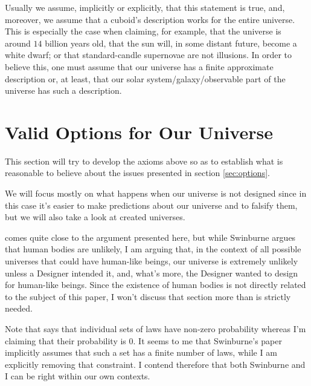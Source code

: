 \documentclass[a4paper
,draft
]{article}
\newcommand{\paper}[1]{paper}
\newcommand{\ghilimele}[1]{``#1"}
\begin{document}
Usually we assume, implicitly or explicitly,
that this statement is true, and, moreover, we assume that a cuboid's description works
for the entire universe.
This is especially the case when claiming, for example,
that the universe is around $14$ billion years old, that the sun will,
in some distant future, become a white dwarf; or that standard-candle supernovae
are not illusions.
In order to believe this, one must assume that our universe has a
finite approximate description or, at least, that our
solar system/galaxy/observable part of the universe has such a description.

\section{Valid Options for Our Universe}
\label{sec:valid-options}

This section will try to develop the axioms above so as to establish what
is reasonable to believe about the issues presented in
section \ref{sec:options}.

We will focus mostly on what happens when our universe is not designed
since in this case it's easier to make predictions about our universe
and to falsify them, but we will also take a look at created universes.

\textcite[][The section entitled \ghilimele{Why a world with human bodies is unlikely
if there is no God}]{Swinburne2003} comes quite close to the argument
presented here, but while Swinburne
argues that human bodies are unlikely, I am arguing that, in the context
of all possible universes that could have human-like beings,
our universe is extremely unlikely unless a Designer intended it,
and, what's more, the Designer wanted to design for human-like
beings.
Since the existence of human bodies is not directly related to the subject
of this \paper{}, I won't discuss that section more
than is strictly needed.

Note that \textcite{Swinburne2003} says that individual sets of laws
have non-zero probability whereas I'm claiming that their probability is $0$.
It seems to me that Swinburne’s paper implicitly assumes that
such a set has a finite number of laws, while I am explicitly removing
that constraint. I contend therefore that both Swinburne and I can be right within our own contexts.
\end{document}
